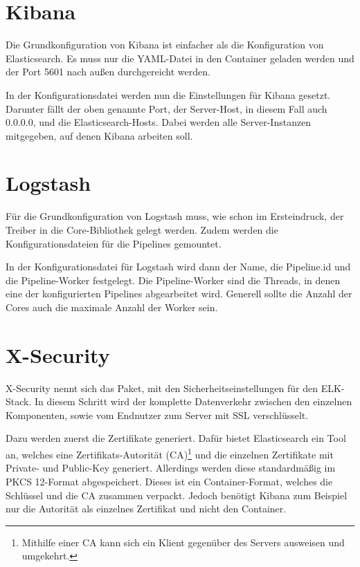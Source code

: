 \section{Kibana}

Die Grundkonfiguration von Kibana ist einfacher als die Konfiguration von Elasticsearch. Es muss nur die YAML-Datei in den Container geladen werden und der Port 5601 nach außen durchgereicht werden.

In der Konfigurationsdatei werden nun die Einstellungen für Kibana gesetzt. Darunter fällt der oben genannte Port, der Server-Host, in diesem Fall auch 0.0.0.0, und die Elasticsearch-Hosts. Dabei werden alle Server-Instanzen mitgegeben, auf denen Kibana arbeiten soll. \cite{ElasticsearchB.V..12.2.2020}

\section{Logstash}

Für die Grundkonfiguration von Logstash muss, wie schon im Ersteindruck, der Treiber in die Core-Bibliothek gelegt werden. Zudem werden die Konfigurationsdateien für die Pipelines gemountet.

In der Konfigurationsdatei für Logstash wird dann der Name, die Pipeline.id und die Pipeline-Worker festgelegt. Die Pipeline-Worker sind die Threads, in denen eine der konfigurierten Pipelines abgearbeitet wird. Generell sollte die Anzahl der Cores auch die maximale Anzahl der Worker sein. \cite{ElasticsearchB.V..12.2.2020b}


\section{X-Security}

X-Security nennt sich das Paket, mit den Sicherheitseinstellungen für den ELK-Stack. In diesem Schritt wird der komplette Datenverkehr zwischen den einzelnen Komponenten, sowie vom Endnutzer zum Server mit SSL verschlüsselt. 

Dazu werden zuerst die Zertifikate generiert. Dafür bietet Elasticsearch ein Tool an, welches eine Zertifikats-Autorität (CA)\footnote{Mithilfe einer CA kann sich ein Klient gegenüber des Servers ausweisen und umgekehrt.} und die einzelnen Zertifikate mit Private- und Public-Key generiert. Allerdings werden diese standardmäßig im PKCS 12-Format abgespeichert. Dieses ist ein Container-Format, welches die Schlüssel und die CA zusammen verpackt. Jedoch benötigt Kibana zum Beispiel nur die Autorität als einzelnes Zertifikat und nicht den Container.

